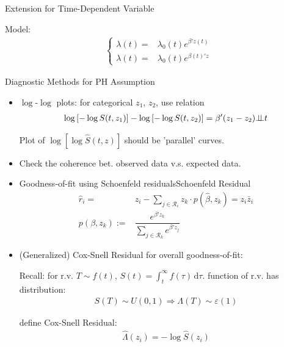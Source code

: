 \begin{point}
    Extension for Time-Dependent Variable
\end{point}

Model:
\begin{align}
    \begin{cases}
        \lambda (t)=&\lambda _0(t)e^{\beta 'z(t)}\\
        \lambda (t)=&\lambda _0(t)e^{\beta (t) 'z}
    \end{cases}
\end{align}

\begin{point}
    Diagnostic Methods for PH Assumption
\end{point}

\begin{itemize}[topsep=2pt,itemsep=0pt]
    \item $ \log $-$ \log $ plots: for categorical $ z_1 $, $ z_2 $, use relation
    \begin{align}
        \log\left[-\log S(t,z_1)\right] -\log\left[-\log S(t,z_2)\right] =\beta '(z_1-z_2)\bot\!\!\!\bot t
    \end{align}
    
    Plot of $ \log\left[\log \hat{S}(t,z)\right] $ should be 'parallel' curves.
    
    \item Check the coherence bet. observed data v.s. expected data.
    \item Goodness-of-fit using Schoenfeld residuals\indexname{Schoenfeld Residual}
    \begin{align}
        \hat{r}_i=&z_i-\sum_{j\in\mathcal{R}_i}z_k\cdot p(\hat{\beta },z_k)=z_i\bar{z}_i\\
        p(\beta ,z_k):=&\dfrac{e^{\beta 'z_k}}{\sum_{j\in\mathcal{R}_k}e^{\beta 'z_j}} 
    \end{align}
    \item (Generalized) Cox-Snell Residual for overall goodness-of-fit: 
    
    Recall: for r.v. $ T\sim f(t) $, $ S(t)=\int _t^\infty f(\tau) \,\mathrm{d}\tau $. function of r.v. has distribution:
    \begin{align}
        S(T)\sim U(0,1)\Rightarrow \Lambda (T)\sim \varepsilon (1) 
    \end{align}

    define Cox-Snell Residual:
    \begin{align}
        \hat{\Lambda }(z_i)=-\log \hat{S}(z_i) 
    \end{align}


\end{itemize}
